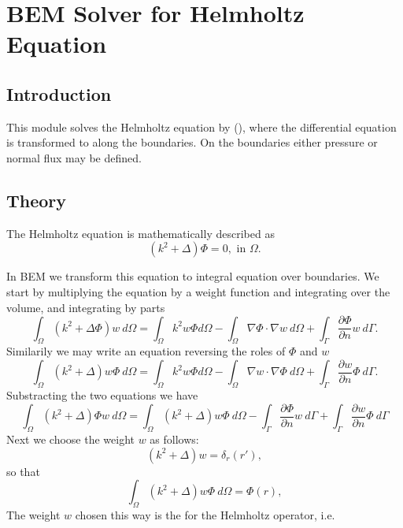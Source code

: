 \chapter{BEM Solver for Helmholtz Equation}

\begin{versiona}

\section{Introduction}

This module solves the Helmholtz equation by  (), where
the differential equation is transformed to  along the
boundaries. On the boundaries either pressure or normal flux may be defined.

\section{Theory}

The Helmholtz equation is mathematically described as
\begin{equation}
(k^2+\Delta ) \Phi  = 0, \mbox{ in } \Omega.
\end{equation}

In BEM we transform this equation to integral equation over boundaries. We start
by multiplying the equation by a weight function and integrating over the volume,
and integrating by parts
\begin{equation}
\int_\Omega (k^2+\Delta \Phi) w\ d\Omega  =
\int_\Omega k^2 w\Phi d\Omega -
\int_\Omega \nabla\Phi\cdot \nabla w\ d\Omega +
\int_\Gamma \frac{\partial\Phi}{\partial n} w\ d\Gamma.
\end{equation}
Similarily we may write an equation reversing the roles of $\Phi$ and $w$
\begin{equation}
\int_\Omega (k^2+\Delta) w \Phi\ d\Omega =
\int_\Omega k^2 w\Phi d\Omega -
\int_\Omega \nabla w\cdot \nabla \Phi\ d\Omega  +
\int_\Gamma \frac{\partial w}{\partial n} \Phi\ d\Gamma.
\end{equation}
Substracting the two equations we have
\begin{equation}
\int_\Omega (k^2+\Delta) \Phi w\ d\Omega =
\int_\Omega (k^2+\Delta) w \Phi\ d\Omega -
\int_\Gamma \frac{\partial\Phi}{\partial n} w\ d\Gamma +
\int_\Gamma \frac{\partial w}{\partial n} \Phi\ d\Gamma
\end{equation}
Next we choose the weight $w$ as follows:
\begin{equation}
(k^2+\Delta)w = \delta_r(r'),
\end{equation}
so that 
\begin{equation}
\int_\Omega (k^2+\Delta) w \Phi\ d\Omega = \Phi(r), 
\end{equation}
The weight $w$ chosen this way is the  for the Helmholtz operator,
i.e.


\end{versiona}
